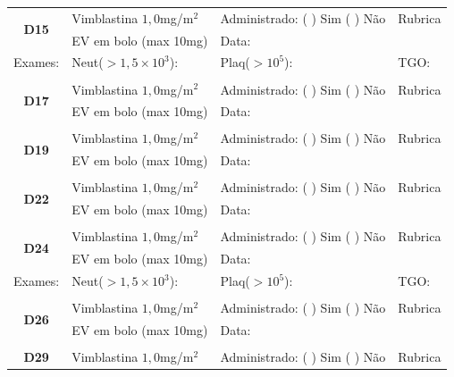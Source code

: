 \documentclass[11pt,a4paper,oldfontcommands]{memoir}
\begin{document}
\begin{center}
\begin{longtable}{p{1cm}p{5cm}|p{5cm}|p{3cm}}
    \hline
    \\
   \hline
       \multicolumn{1}{c|}{\multirow{2}{*}{\textbf{D15}}}&{Vimblastina \(1,0\)mg/m\(^2\)}&{Administrado: (  ) Sim (  ) Não}&{Rubrica}\\
    \multicolumn{1}{c|}{}&{EV em bolo (max 10mg)}&{Data:}&\\
    \hline
    {\tiny{Exames:}}&{\tiny{Neut(\(>1,5\times10^3\)):}}&{\tiny{Plaq(\(>10^5\)):}}&{\tiny{TGO:}}
    \\
    \hline
    \\
    \hline
    \multicolumn{1}{c|}{\multirow{2}{*}{\textbf{D17}}}&{Vimblastina \(1,0\)mg/m\(^2\)}&{Administrado: (  ) Sim (  ) Não}&{Rubrica}\\
    \multicolumn{1}{c|}{}&{EV em bolo (max 10mg)}&{Data:}&\\
    \hline
    \\
    \hline
    \multicolumn{1}{c|}{\multirow{2}{*}{\textbf{D19}}}&{Vimblastina \(1,0\)mg/m\(^2\)}&{Administrado: (  ) Sim (  ) Não}&{Rubrica}\\
    \multicolumn{1}{c|}{}&{EV em bolo (max 10mg)}&{Data:}&\\
    \hline
    \\
    \hline
    \multicolumn{1}{c|}{\multirow{2}{*}{\textbf{D22}}}&{Vimblastina \(1,0\)mg/m\(^2\)}&{Administrado: (  ) Sim (  ) Não}&{Rubrica}\\
    \multicolumn{1}{c|}{}&{EV em bolo (max 10mg)}&{Data:}&\\
    \hline
    \\
    \hline
    \multicolumn{1}{c|}{\multirow{2}{*}{\textbf{D24}}}&{Vimblastina \(1,0\)mg/m\(^2\)}&{Administrado: (  ) Sim (  ) Não}&{Rubrica}\\
    \multicolumn{1}{c|}{}&{EV em bolo (max 10mg)}&{Data:}&\\
    \hline
    {\tiny{Exames:}}&{\tiny{Neut(\(>1,5\times10^3\)):}}&{\tiny{Plaq(\(>10^5\)):}}&{\tiny{TGO:}}
    \\
    \hline\\
    \hline
    \multicolumn{1}{c|}{\multirow{2}{*}{\textbf{D26}}}&{Vimblastina \(1,0\)mg/m\(^2\)}&{Administrado: (  ) Sim (  ) Não}&{Rubrica}\\
    \multicolumn{1}{c|}{}&{EV em bolo (max 10mg)}&{Data:}&\\
    \hline
    \\
   \hline
          \multicolumn{1}{c|}{\multirow{2}{*}{\textbf{D29}}}&{Vimblastina \(1,0\)mg/m\(^2\)}&{Administrado: (  ) Sim (  ) Não}&{Rubrica}\\

\end{longtable}
\end{center}
\end{document}
